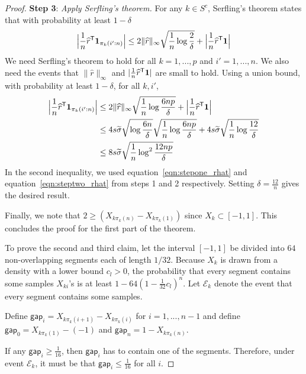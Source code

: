 \begin{proof}
\vskip5pt
\textbf{Step 3}: {\it Apply Serfling's theorem.}  
For any $k \in S^c$, Serfling's theorem states that with probability at least $1 - \delta$
\begin{align*}
\Big
|\frac{1}{n} \widehat{r}^{\mathsf{T}} \mbox{\boldmath $1$}_{\pi_k(i':n)}\Big| \leq
   2\| \widehat{r} \|_\infty \sqrt{ \frac{1}{n} \log \frac{2}{\delta}} + 
   \Big|\frac{1}{n} \widehat{r}^{\mathsf{T}} \mbox{\boldmath $1$} \Big|
\end{align*}
We need Serfling's theorem to hold for all $k = 1,...,p$ and $i' =
1,...,n$. We also need the events that $\|\hat{r}\|_\infty$ and $|
\frac{1}{n} \widehat{r}^{\mathsf{T}} \mbox{\boldmath $1$}|$ are small to hold. Using a
union bound, with probability at least $1-\delta$, for all $k,i'$,
\begin{align*}
\Big
|\frac{1}{n} \widehat{r}^{\mathsf{T}} \mbox{\boldmath $1$}_{\pi_k(i':n)}\Big| &\leq
   2\| \widehat{r} \|_\infty \sqrt{ \frac{1}{n} \log \frac{6np}{\delta}} + 
   \Big|\frac{1}{n} \widehat{r}^{\mathsf{T}} \mbox{\boldmath $1$} \Big|\\
  &\leq 4s\widetilde{\sigma}\sqrt{\log \frac{6n}{\delta}} \sqrt{\frac{1}{n}\log \frac{6np}{\delta}} + 4 s \widetilde{\sigma} \sqrt{\frac{1}{n}\log \frac{12}{\delta}} \\
  &\leq 8 s\widetilde{\sigma} \sqrt{ \frac{1}{n} \log^2 \frac{12np}{\delta}}
\end{align*}
In the second inequality, we used equation~\eqref{eqn:stepone_rhat}
and equation~\eqref{eqn:steptwo_rhat} from steps 1 and 2
respectively. Setting $\delta = \frac{12}{n}$ gives the desired
result.

Finally, we note that $2 \geq (X_{k\pi_k(n)} - X_{k\pi_k(1)})$ since $X_k \subset [-1,1]$. This concludes the proof for the first part of the theorem. 

To prove the second and third claim, let the interval $[-1, 1]$ be divided into $64$ non-overlapping segments each of length $1/32$. Because $X_k$ is drawn from a density with a lower bound $c_l > 0$, the probability that every segment contains some samples $X_{ki}$'s is at least $1-64 \left( 1 - \frac{1}{32} c_l \right)^n$. Let $\mathcal{E}_k$ denote the event that every segment contains some samples. 

Define $\mathsf{gap}_i = X_{k \pi_k(i+1)} - X_{k \pi_k(i)}$ for $i=1,...,n-1$ and define $\mathsf{gap}_0 = X_{k \pi_k(1)} - (-1)$ and $\mathsf{gap}_{n} = 1 - X_{k\pi_k(n)}$. 

If any $\mathsf{gap}_i \geq \frac{1}{16}$, then $\mathsf{gap}_i$ has to contain one of the segments. Therefore, under event $\mathcal{E}_k$, it must be that $\mathsf{gap}_i \leq \frac{1}{16}$ for all $i$.


\end{proof}
